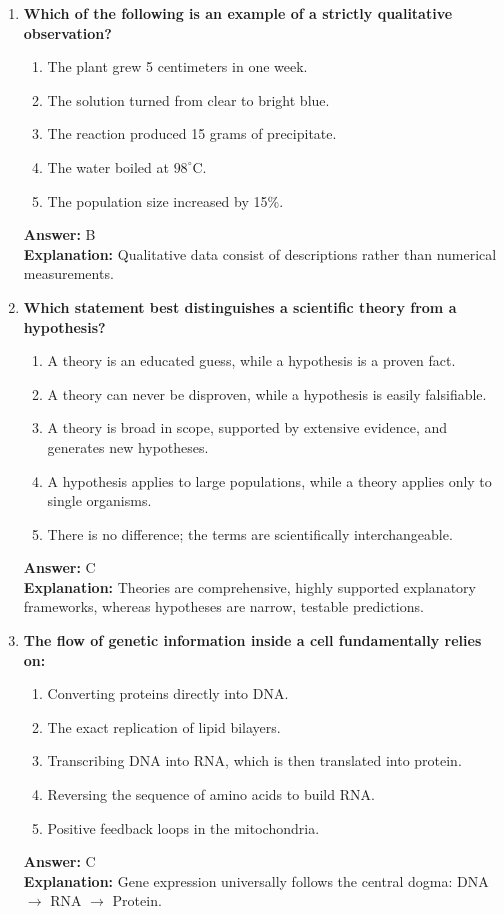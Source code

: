 \documentclass[11pt, a4paper]{article}
\begin{document}
\begin{enumerate}
\item \textbf{Which of the following is an example of a strictly qualitative observation?}
\begin{enumerate}[label=\Alph*.]
    \item The plant grew 5 centimeters in one week.
    \item The solution turned from clear to bright blue.
    \item The reaction produced 15 grams of precipitate.
    \item The water boiled at $98^\circ\text{C}$.
    \item The population size increased by 15\%.
\end{enumerate}
\textbf{Answer:} B \\
\textbf{Explanation:} Qualitative data consist of descriptions rather than numerical measurements.

\item \textbf{Which statement best distinguishes a scientific theory from a hypothesis?}
\begin{enumerate}[label=\Alph*.]
    \item A theory is an educated guess, while a hypothesis is a proven fact.
    \item A theory can never be disproven, while a hypothesis is easily falsifiable.
    \item A theory is broad in scope, supported by extensive evidence, and generates new hypotheses.
    \item A hypothesis applies to large populations, while a theory applies only to single organisms.
    \item There is no difference; the terms are scientifically interchangeable.
\end{enumerate}
\textbf{Answer:} C \\
\textbf{Explanation:} Theories are comprehensive, highly supported explanatory frameworks, whereas hypotheses are narrow, testable predictions.

\item \textbf{The flow of genetic information inside a cell fundamentally relies on:}
\begin{enumerate}[label=\Alph*.]
    \item Converting proteins directly into DNA.
    \item The exact replication of lipid bilayers.
    \item Transcribing DNA into RNA, which is then translated into protein.
    \item Reversing the sequence of amino acids to build RNA.
    \item Positive feedback loops in the mitochondria.
\end{enumerate}
\textbf{Answer:} C \\
\textbf{Explanation:} Gene expression universally follows the central dogma: DNA $\rightarrow$ RNA $\rightarrow$ Protein.


\end{enumerate}
\end{document}
